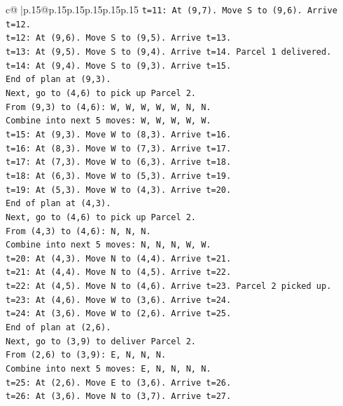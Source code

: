 \documentclass{article}
\begin{document}
{\begin{supertabular}{c@{$\;$}|p{.15\linewidth}@{}p{.15\linewidth}p{.15\linewidth}p{.15\linewidth}p{.15\linewidth}p{.15\linewidth}}
{{{\texttt{t=11: At (9,7). Move S to (9,6). Arrive t=12.} \\
\texttt{t=12: At (9,6). Move S to (9,5). Arrive t=13.} \\
\texttt{t=13: At (9,5). Move S to (9,4). Arrive t=14. Parcel 1 delivered.} \\
\texttt{t=14: At (9,4). Move S to (9,3). Arrive t=15.} \\
\texttt{End of plan at (9,3).} \\
\texttt{Next, go to (4,6) to pick up Parcel 2.} \\
\texttt{From (9,3) to (4,6): W, W, W, W, W, N, N.} \\
\texttt{Combine into next 5 moves: W, W, W, W, W.} \\
\texttt{t=15: At (9,3). Move W to (8,3). Arrive t=16.} \\
\texttt{t=16: At (8,3). Move W to (7,3). Arrive t=17.} \\
\texttt{t=17: At (7,3). Move W to (6,3). Arrive t=18.} \\
\texttt{t=18: At (6,3). Move W to (5,3). Arrive t=19.} \\
\texttt{t=19: At (5,3). Move W to (4,3). Arrive t=20.} \\
\texttt{End of plan at (4,3).} \\
\texttt{Next, go to (4,6) to pick up Parcel 2.} \\
\texttt{From (4,3) to (4,6): N, N, N.} \\
\texttt{Combine into next 5 moves: N, N, N, W, W.} \\
\texttt{t=20: At (4,3). Move N to (4,4). Arrive t=21.} \\
\texttt{t=21: At (4,4). Move N to (4,5). Arrive t=22.} \\
\texttt{t=22: At (4,5). Move N to (4,6). Arrive t=23. Parcel 2 picked up.} \\
\texttt{t=23: At (4,6). Move W to (3,6). Arrive t=24.} \\
\texttt{t=24: At (3,6). Move W to (2,6). Arrive t=25.} \\
\texttt{End of plan at (2,6).} \\
\texttt{Next, go to (3,9) to deliver Parcel 2.} \\
\texttt{From (2,6) to (3,9): E, N, N, N.} \\
\texttt{Combine into next 5 moves: E, N, N, N, N.} \\
\texttt{t=25: At (2,6). Move E to (3,6). Arrive t=26.} \\
\texttt{t=26: At (3,6). Move N to (3,7). Arrive t=27.} \\
}}}
\end{supertabular}}
\end{document}
